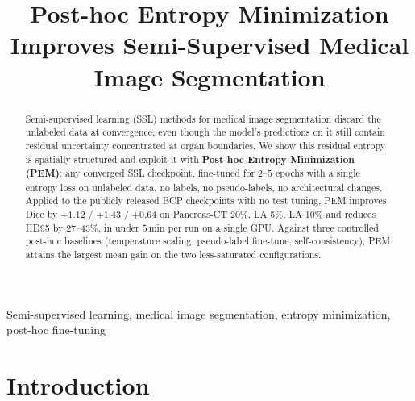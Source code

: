 \documentclass{midl}
\title[Post-hoc Entropy Minimization for SSL Segmentation]{Post-hoc Entropy Minimization Improves Semi-Supervised Medical Image Segmentation}
\begin{document}
\maketitle

\begin{abstract}
Semi-supervised learning (SSL) methods for medical image segmentation discard the unlabeled data at convergence, even though the model's predictions on it still contain residual uncertainty concentrated at organ boundaries. We show this residual entropy is spatially structured and exploit it with \textbf{Post-hoc Entropy Minimization (PEM)}: any converged SSL checkpoint, fine-tuned for $2$--$5$ epochs with a single entropy loss on unlabeled data, no labels, no pseudo-labels, no architectural changes.
Applied to the publicly released BCP checkpoints with no test tuning, PEM improves Dice by $+1.12$ / $+1.43$ / $+0.64$ on Pancreas-CT 20\%, LA 5\%, LA 10\% and reduces HD95 by $27$--$43\%$, in under $5$\,min per run on a single GPU.
Against three controlled post-hoc baselines (temperature scaling, pseudo-label fine-tune, self-consistency), PEM attains the largest mean gain on the two less-saturated configurations.
\end{abstract}

\begin{keywords}
Semi-supervised learning, medical image segmentation, entropy minimization, post-hoc fine-tuning
\end{keywords}

\section{Introduction}
\label{sec:intro}
\end{document}
